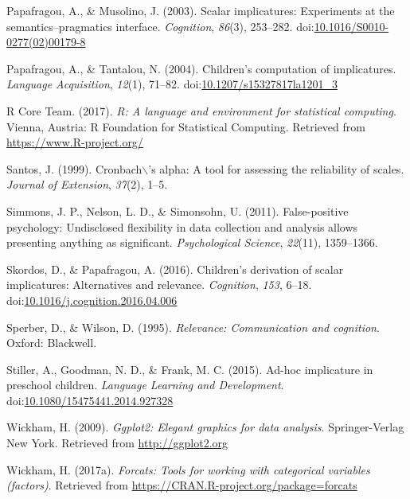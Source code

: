 \documentclass[man]{apa6}
\begin{document}
\hypertarget{ref-papafragou2003}{}
Papafragou, A., \& Musolino, J. (2003). Scalar implicatures: Experiments
at the semantics--pragmatics interface. \emph{Cognition}, \emph{86}(3),
253--282.
doi:\href{https://doi.org/10.1016/S0010-0277(02)00179-8}{10.1016/S0010-0277(02)00179-8}

\hypertarget{ref-papafragou2004}{}
Papafragou, A., \& Tantalou, N. (2004). Children's computation of
implicatures. \emph{Language Acquisition}, \emph{12}(1), 71--82.
doi:\href{https://doi.org/10.1207/s15327817la1201_3}{10.1207/s15327817la1201\_3}

\hypertarget{ref-R-base}{}
R Core Team. (2017). \emph{R: A language and environment for statistical
computing}. Vienna, Austria: R Foundation for Statistical Computing.
Retrieved from \url{https://www.R-project.org/}

\hypertarget{ref-santos1999cronbach}{}
Santos, J. (1999). Cronbach\(\backslash\)'s alpha: A tool for assessing
the reliability of scales. \emph{Journal of Extension}, \emph{37}(2),
1--5.

\hypertarget{ref-simmons2011false}{}
Simmons, J. P., Nelson, L. D., \& Simonsohn, U. (2011). False-positive
psychology: Undisclosed flexibility in data collection and analysis
allows presenting anything as significant. \emph{Psychological Science},
\emph{22}(11), 1359--1366.

\hypertarget{ref-skordos2016}{}
Skordos, D., \& Papafragou, A. (2016). Children's derivation of scalar
implicatures: Alternatives and relevance. \emph{Cognition}, \emph{153},
6--18.
doi:\href{https://doi.org/10.1016/j.cognition.2016.04.006}{10.1016/j.cognition.2016.04.006}

\hypertarget{ref-sperber1986}{}
Sperber, D., \& Wilson, D. (1995). \emph{Relevance: Communication and
cognition}. Oxford: Blackwell.

\hypertarget{ref-stiller2015}{}
Stiller, A., Goodman, N. D., \& Frank, M. C. (2015). Ad-hoc implicature
in preschool children. \emph{Language Learning and Development}.
doi:\href{https://doi.org/10.1080/15475441.2014.927328}{10.1080/15475441.2014.927328}

\hypertarget{ref-R-ggplot2}{}
Wickham, H. (2009). \emph{Ggplot2: Elegant graphics for data analysis}.
Springer-Verlag New York. Retrieved from \url{http://ggplot2.org}

\hypertarget{ref-R-forcats}{}
Wickham, H. (2017a). \emph{Forcats: Tools for working with categorical
variables (factors)}. Retrieved from
\url{https://CRAN.R-project.org/package=forcats}
\end{document}
